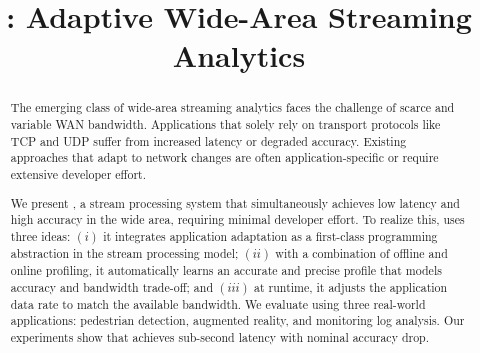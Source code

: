 \documentclass[sigplan,10pt,anonymous]{acmart}
\begin{document}


\title{\sysname{}: Adaptive Wide-Area Streaming Analytics}
\gdef\addresses{Paper \textbf{\#200}, 12 pages}

\begin{abstract}
  The emerging class of wide-area streaming analytics faces the challenge of
  scarce and variable WAN bandwidth. Applications that solely rely on
  transport protocols like TCP and UDP suffer from increased latency or degraded
  accuracy. Existing approaches that adapt to network changes are often
  application-specific or require extensive developer effort.

  We present \sysname{}, a stream processing system that simultaneously achieves
  low latency and high accuracy in the wide area, requiring minimal developer
  effort. To realize this, \sysname{} uses three ideas: $(i)$ it integrates
  application adaptation as a first-class programming abstraction in the stream
  processing model; $(ii)$ with a combination of offline and online profiling,
  it automatically learns an accurate and precise profile that models accuracy and
  bandwidth trade-off; and $(iii)$ at runtime, it adjusts the application data rate
  to match the available bandwidth. We evaluate \sysname{} using three
  real-world applications: pedestrian detection, augmented reality, and
  monitoring log analysis. Our experiments show that \sysname{} achieves
  sub-second latency with nominal accuracy drop.
\end{abstract}

\maketitle











\def \bibfont {\normalsize}

\end{document}
